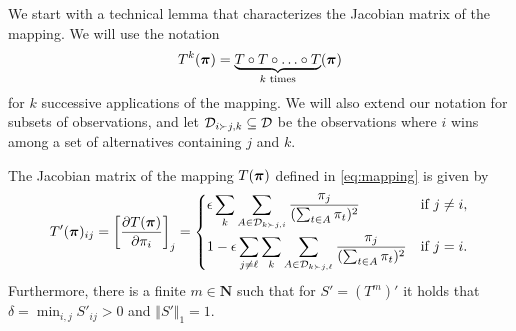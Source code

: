 We start with a technical lemma that characterizes the Jacobian matrix of the mapping.
We will use the notation
\begin{align}
T^k(\bm{\pi}) = \underbrace{T \circ T \circ \ldots \circ T}_{\text{$k$ times}}(\bm{\pi})
\end{align}
for $k$ successive applications of the mapping.
We will also extend our notation for subsets of observations, and let $\mathcal{D}_{i \succ j,k} \subseteq \mathcal{D}$ be the observations where $i$ wins among a set of alternatives containing $j$ and $k$.
\begin{lemma}
\label{lem:jacobian}
The Jacobian matrix of the mapping $T(\bm{\pi})$ defined in \eqref{eq:mapping} is given by
\begin{align}
T'(\bm{\pi})_{ij} = \left[ \frac{\partial T(\bm{\pi})}{\partial \pi_i} \right]_j =
\begin{dcases}
\epsilon \sum_{k} \sum_{A \in \mathcal{D}_{k \succ j,i}} \frac{\pi_j}{(\sum_{t \in A} \pi_t)^2}                          & \text{if } j \ne i, \\
1 - \epsilon \sum_{j \ne \ell} \sum_{k} \sum_{A \in \mathcal{D}_{k \succ j,\ell}} \frac{\pi_j}{(\sum_{t \in A} \pi_t)^2} & \text{if } j = i.
\end{dcases}
\end{align}
Furthermore, there is a finite $m \in \mathbf{N}$ such that for $S' = (T^m)'$ it holds that $\delta = \min_{i,j} S'_{ij} > 0$ and $\Vert S' \Vert_1 = 1$.
\end{lemma}

